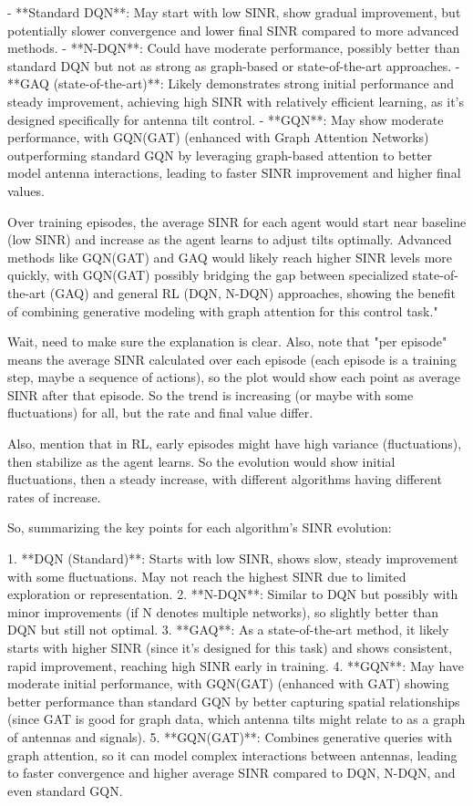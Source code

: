 - **Standard DQN**: May start with low SINR, show gradual improvement, but potentially slower convergence and lower final SINR compared to more advanced methods. 
- **N-DQN**: Could have moderate performance, possibly better than standard DQN but not as strong as graph-based or state-of-the-art approaches. 
- **GAQ (state-of-the-art)**: Likely demonstrates strong initial performance and steady improvement, achieving high SINR with relatively efficient learning, as it’s designed specifically for antenna tilt control. 
- **GQN**: May show moderate performance, with GQN(GAT) (enhanced with Graph Attention Networks) outperforming standard GQN by leveraging graph-based attention to better model antenna interactions, leading to faster SINR improvement and higher final values. 

Over training episodes, the average SINR for each agent would start near baseline (low SINR) and increase as the agent learns to adjust tilts optimally. Advanced methods like GQN(GAT) and GAQ would likely reach higher SINR levels more quickly, with GQN(GAT) possibly bridging the gap between specialized state-of-the-art (GAQ) and general RL (DQN, N-DQN) approaches, showing the benefit of combining generative modeling with graph attention for this control task."

Wait, need to make sure the explanation is clear. Also, note that "per episode" means the average SINR calculated over each episode (each episode is a training step, maybe a sequence of actions), so the plot would show each point as average SINR after that episode. So the trend is increasing (or maybe with some fluctuations) for all, but the rate and final value differ.

Also, mention that in RL, early episodes might have high variance (fluctuations), then stabilize as the agent learns. So the evolution would show initial fluctuations, then a steady increase, with different algorithms having different rates of increase.

So, summarizing the key points for each algorithm's SINR evolution:

1. **DQN (Standard)**: Starts with low SINR, shows slow, steady improvement with some fluctuations. May not reach the highest SINR due to limited exploration or representation.
2. **N-DQN**: Similar to DQN but possibly with minor improvements (if N denotes multiple networks), so slightly better than DQN but still not optimal.
3. **GAQ**: As a state-of-the-art method, it likely starts with higher SINR (since it’s designed for this task) and shows consistent, rapid improvement, reaching high SINR early in training.
4. **GQN**: May have moderate initial performance, with GQN(GAT) (enhanced with GAT) showing better performance than standard GQN by better capturing spatial relationships (since GAT is good for graph data, which antenna tilts might relate to as a graph of antennas and signals).
5. **GQN(GAT)**: Combines generative queries with graph attention, so it can model complex interactions between antennas, leading to faster convergence and higher average SINR compared to DQN, N-DQN, and even standard GQN.

